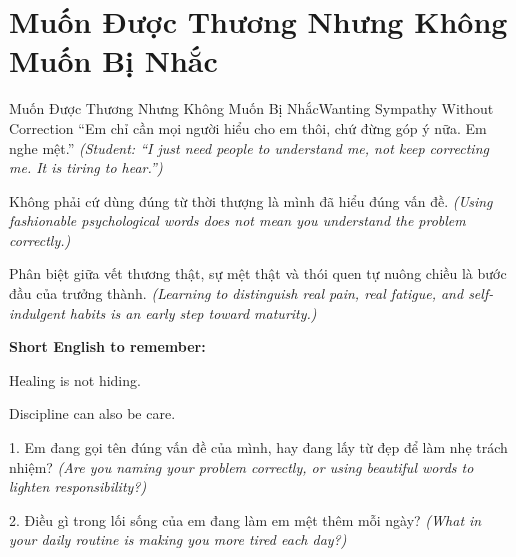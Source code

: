 \section{Muốn Được Thương Nhưng Không Muốn Bị Nhắc}
\begin{truyen}{Muốn Được Thương Nhưng Không Muốn Bị Nhắc}{Wanting Sympathy Without Correction}
 ``Em chỉ cần mọi người hiểu cho em thôi, chứ đừng góp ý nữa. Em nghe mệt.''
\textit{(Student: ``I just need people to understand me, not keep correcting me. It is tiring to hear.'')}

\end{truyen}

\begin{baihoc}
Không phải cứ dùng đúng từ thời thượng là mình đã hiểu đúng vấn đề.
\textit{(Using fashionable psychological words does not mean you understand the problem correctly.)}

Phân biệt giữa vết thương thật, sự mệt thật và thói quen tự nuông chiều là bước đầu của trưởng thành.
\textit{(Learning to distinguish real pain, real fatigue, and self-indulgent habits is an early step toward maturity.)}
\end{baihoc}

\begin{ghinhoanh}
\textbf{Short English to remember:}

Healing is not hiding.

Discipline can also be care.
\end{ghinhoanh}

\begin{tuhocnhanh}
1. Em đang gọi tên đúng vấn đề của mình, hay đang lấy từ đẹp để làm nhẹ trách nhiệm? \textit{(Are you naming your problem correctly, or using beautiful words to lighten responsibility?)}

2. Điều gì trong lối sống của em đang làm em mệt thêm mỗi ngày? \textit{(What in your daily routine is making you more tired each day?)}
\end{tuhocnhanh}

\ngancach

